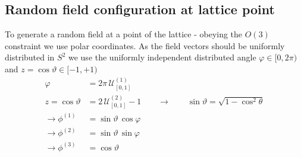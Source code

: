 \documentclass[10pt,a4paper]{article}
\theoremstyle{definition}
\begin{document}
\subsection{Random field configuration at lattice point}
To generate a random field at a point of the lattice - obeying the $O(3)$ constraint we use polar coordinates. As the field vectors should be uniformly distributed in $S^2$ we use the uniformly independent distributed angle $\varphi\in[0,2\pi)$ and $z=\cos\vartheta\in[-1,+1)$
\begin{align}
\varphi   &= 2\pi\,\mathcal{U}^{(1)}_{[0,1]}\\
z=\cos\vartheta &= 2\,\mathcal{U}^{(2)}_{[0,1]}-1\qquad\rightarrow\qquad\sin\vartheta=\sqrt{1-\cos^2\theta}\\
\rightarrow\phi^{(1)}&=\sin\vartheta\, \cos\varphi\\
\rightarrow\phi^{(2)}&=\sin\vartheta\, \sin\varphi\\
\rightarrow\phi^{(3)}&=\cos\vartheta
\end{align} 
\end{document}
